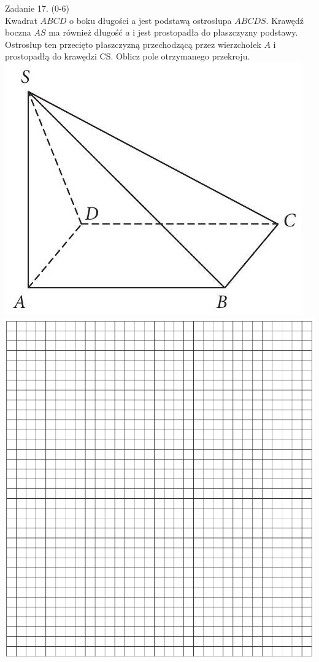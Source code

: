 \documentclass[10pt]{article}
\begin{document}
Zadanie 17. (0-6)\\
Kwadrat \(A B C D\) o boku długości a jest podstawą ostrosłupa \(A B C D S\). Krawędź boczna \(A S\) ma również długość \(a\) i jest prostopadła do płaszczyzny podstawy. Ostrosłup ten przecięto płaszczyzną przechodzącą przez wierzchołek \(A\) i prostopadłą do krawędzi CS. Oblicz pole otrzymanego przekroju.\\
\includegraphics[max width=\textwidth, center]{2024_11_21_8206013b40ecc9b11a30g-14}\\
\includegraphics[max width=\textwidth, center]{2024_11_21_8206013b40ecc9b11a30g-14(1)}\\
\end{document}

